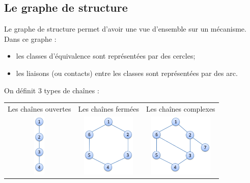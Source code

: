 \documentclass[10pt,oneside]{article}
\begin{document}
\subsection{Le graphe de structure}
\begin{defi}
Le graphe de structure permet d'avoir une vue d'ensemble sur un mécanisme. Dans ce graphe :
\begin{itemize}
\item les classes d'équivalence sont représentées par des cercles;
\item les liaisons (ou contacts) entre les classes sont représentées par des arc.
\end{itemize} 
On définit 3 types de chaînes :
\begin{center}
\begin{tabular}{ccc}
Les chaînes ouvertes & Les chaînes fermées & Les chaînes complexes \\
\includegraphics[height=3cm]{png/co.png}
&
\includegraphics[height=3cm]{png/cf.png}
&
\includegraphics[height=3cm]{png/cc.png}\\
\end{tabular}
\end{center}



\end{defi}
\end{document}
